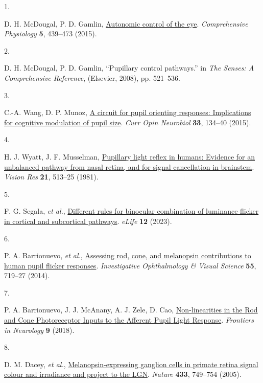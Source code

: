 \documentclass[
]{article}
\newlength{\cslhangindent}
\newlength{\csllabelwidth}
\newlength{\cslentryspacingunit} %
\newenvironment{CSLReferences}[2] %
 {%
  \setlength{\parindent}{0pt}
  \ifodd #1
  \let\oldpar\par
  \def\par{\hangindent=\cslhangindent\oldpar}
  \fi
  \setlength{\parskip}{#2\cslentryspacingunit}
 }%
 {}
\newcommand{\CSLLeftMargin}[1]{\parbox[t]{\csllabelwidth}{#1}}
\newcommand{\CSLRightInline}[1]{\parbox[t]{\linewidth - \csllabelwidth}{#1}\break}
\begin{document}
\hypertarget{refs}{}
\begin{CSLReferences}{0}{0}
\leavevmode{}%
\CSLLeftMargin{1. }%
\CSLRightInline{D. H. McDougal, P. D. Gamlin, \href{https://doi.org/10.1002/cphy.c140014}{Autonomic control of the eye}. \emph{Comprehensive Physiology} \textbf{5}, 439--473 (2015).}

\leavevmode{}%
\CSLLeftMargin{2. }%
\CSLRightInline{D. H. McDougal, P. D. Gamlin, {``Pupillary control pathways.''} in \emph{The Senses: A Comprehensive Reference}, (Elsevier, 2008), pp. 521--536.}

\leavevmode{}%
\CSLLeftMargin{3. }%
\CSLRightInline{C.-A. Wang, D. P. Munoz, \href{https://doi.org/10.1016/j.conb.2015.03.018}{A circuit for pupil orienting responses: Implications for cognitive modulation of pupil size}. \emph{Curr Opin Neurobiol} \textbf{33}, 134--40 (2015).}

\leavevmode{}%
\CSLLeftMargin{4. }%
\CSLRightInline{H. J. Wyatt, J. F. Musselman, \href{https://doi.org/10.1016/0042-6989(81)90097-3}{Pupillary light reflex in humans: Evidence for an unbalanced pathway from nasal retina, and for signal cancellation in brainstem}. \emph{Vision Res} \textbf{21}, 513--25 (1981).}

\leavevmode{}%
\CSLLeftMargin{5. }%
\CSLRightInline{F. G. Segala, \emph{et al.}, \href{https://doi.org/10.7554/elife.87048}{Different rules for binocular combination of luminance flicker in cortical and subcortical pathways}. \emph{eLife} \textbf{12} (2023).}

\leavevmode{}%
\CSLLeftMargin{6. }%
\CSLRightInline{P. A. Barrionuevo, \emph{et al.}, \href{https://doi.org/10.1167/iovs.13-13252}{Assessing rod, cone, and melanopsin contributions to human pupil flicker responses}. \emph{Investigative Ophthalmology \& Visual Science} \textbf{55}, 719--27 (2014).}

\leavevmode{}%
\CSLLeftMargin{7. }%
\CSLRightInline{P. A. Barrionuevo, J. J. McAnany, A. J. Zele, D. Cao, \href{https://doi.org/10.3389/fneur.2018.01140}{Non-linearities in the {Rod} and {Cone} {Photoreceptor} {Inputs} to the {Afferent} {Pupil} {Light} {Response}}. \emph{Frontiers in Neurology} \textbf{9} (2018).}

\leavevmode{}%
\CSLLeftMargin{8. }%
\CSLRightInline{D. M. Dacey, \emph{et al.}, \href{https://doi.org/10.1038/nature03387}{Melanopsin-expressing ganglion cells in primate retina signal colour and irradiance and project to the {LGN}}. \emph{Nature} \textbf{433}, 749--754 (2005).}


\end{CSLReferences}
\end{document}
